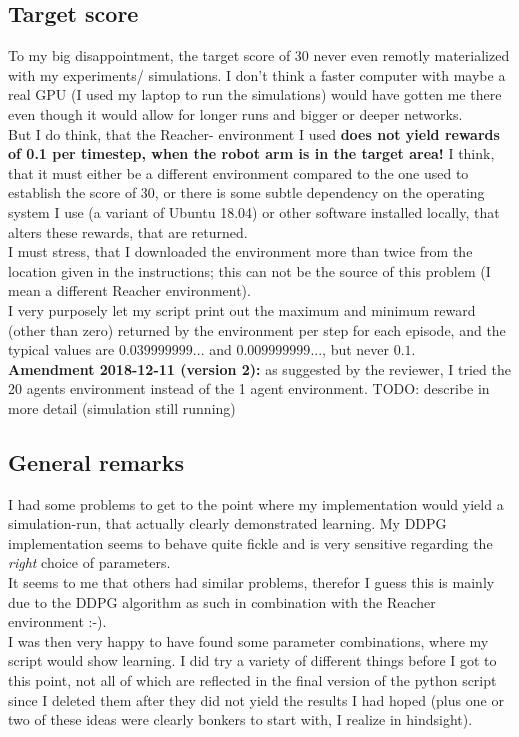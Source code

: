 \documentclass[a4paper]{article}
\begin{document}
\subsection{Target score}
To my big disappointment, the target score of 30 never even remotly materialized
with my experiments/ simulations. I don't think a faster computer with maybe
a real GPU (I used my laptop to run the simulations) would have gotten me there
even though it would allow for longer runs and bigger or deeper networks.
\\
But I do think, that the Reacher- environment I used \textbf{does not yield
rewards of 0.1 per timestep, when the robot arm is in the target area!}
I think, that it must either be a different environment compared to the one
used to establish the score of 30, or there is some subtle dependency on
the operating system I use (a variant of Ubuntu 18.04) or other software
installed locally, that alters these rewards, that are returned.
\\
I must stress, that I downloaded the environment more than twice from the
location given in the instructions; this can not be the source of this problem
(I mean a different Reacher environment).
\\
I very purposely let my script print out the maximum and minimum reward
(other than zero) returned by the environment per step for each episode,
and the typical values are $0.039999999...$ and $0.009999999...$, but never $0.1$.
\\
\textbf{Amendment 2018-12-11 (version 2):} as suggested by the reviewer, I
tried the 20 agents environment instead of the 1 agent environment.
TODO: describe in more detail (simulation still running)

\subsection{General remarks}
I had some problems to get to the point where my implementation would yield
a simulation-run, that actually clearly demonstrated learning. My DDPG implementation
seems to behave quite fickle and is very sensitive regarding the \textit{right}
choice of parameters.\\
It seems to me that others had similar problems, therefor I guess this is
mainly due to the DDPG algorithm as such in combination with the Reacher environment :-).
\\
I was then very happy to have found some parameter combinations, where my
script would show learning. I did try a variety of different things before
I got to this point, not all of which are reflected in the final version
of the python script since I deleted them after they did not yield
the results I had hoped (plus one or two of these ideas were clearly bonkers
to start with, I realize in hindsight).
\end{document}
